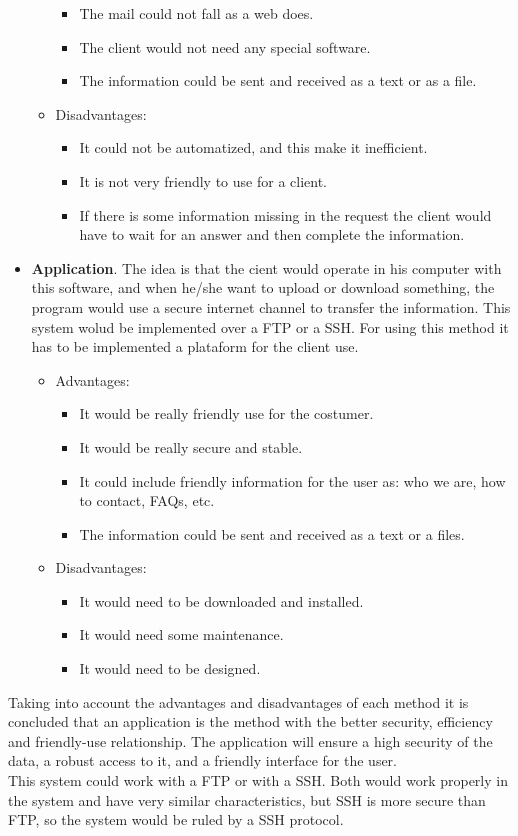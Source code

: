 \begin{itemize}
\begin{itemize}
\begin{itemize}
\item The mail could not fall as a web does.
\item The client would not need any special software.
\item The information could be sent and received as a text or as a file.
\end{itemize}
\item Disadvantages: 
\begin{itemize}
\item It could not be automatized, and this make it inefficient.
\item It is not very friendly to use for a client.
\item If there is some information missing in the request the client would have to wait for an answer and then complete the information. 
\end{itemize}
\end{itemize}
\item \textbf{Application}.  The idea is that the cient would operate in his computer with this software, and when he/she want to upload or download something, the program would use a secure internet channel to transfer the information. This system wolud be implemented over a FTP or a SSH. For using this method it has to be implemented a plataform for the client use.
\begin{itemize}
\item Advantages:
\begin{itemize}
\item It would be really friendly use for the costumer.
\item It would be really secure and stable.
\item It could include friendly information for the user as: who we are, how to contact, FAQs, etc.
\item The information could be sent and received as a text or a files.
\end{itemize}
\item Disadvantages:
\begin{itemize}
\item It would need to be downloaded and installed.
\item It would need some maintenance.
\item It would need to be designed.
\end{itemize}
\end{itemize}
\end{itemize}
Taking into account the advantages and disadvantages of each method it is concluded that an application is the method with the better security, efficiency and friendly-use relationship. The application will ensure a high security of the data, a robust access to it, and a friendly interface for the user.
\\
This system could work with a FTP or with a SSH. Both would work properly in the system and have very similar characteristics, but SSH is more secure than FTP, so the system would be ruled by a SSH protocol.



